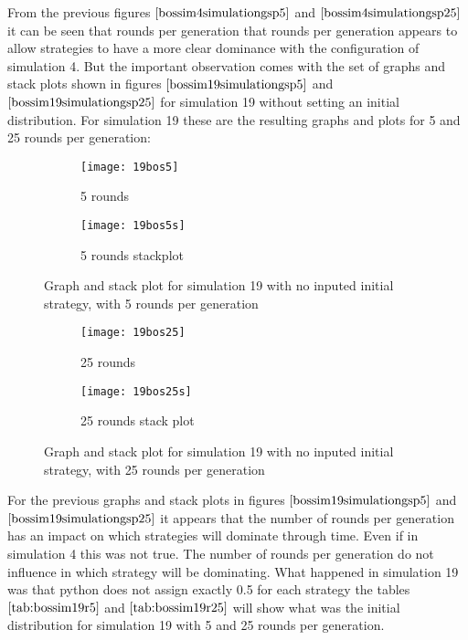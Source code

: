 From the previous figures $\ref{bossim4simulationgsp5}$ and $\ref{bossim4simulationgsp25}$ it can be seen that rounds per generation that rounds per generation appears to allow strategies to have a more clear dominance with the configuration of simulation 4. But the important observation comes with the set of graphs and stack plots shown in figures $\ref{bossim19simulationgsp5}$ and $\ref{bossim19simulationgsp25}$ for simulation 19 without setting an initial distribution.
For simulation 19 these are the resulting graphs and plots for 5 and 25 rounds per generation:
\begin{figure}[H]       
    \centering
    \begin{subfigure}[b]{0.4\textwidth}
	\centering
	{\texttt{[image: 19bos5]}}   
    	\caption{5 rounds}
	\label{fig:bossim19r5}
    \end{subfigure}
    \hfill
    \begin{subfigure}[b]{0.4\textwidth}
	\centering
	{\texttt{[image: 19bos5s]}}   
    	\caption{5 rounds stackplot}
	\label{fig:bossim19rs5}
    \end{subfigure}
    \caption{Graph and stack plot for simulation 19 with no inputed initial strategy, with 5 rounds per generation}
    \label{bossim19simulationgsp5}
\end{figure}

\begin{figure}[H]       
    \centering
    \begin{subfigure}[b]{0.4\textwidth}
	\centering
	{\texttt{[image: 19bos25]}}   
    	\caption{25 rounds}
	\label{fig:bossim19r25}
    \end{subfigure}
    \hfill
    \begin{subfigure}[b]{0.4\textwidth}
	\centering
	{\texttt{[image: 19bos25s]}}   
    	\caption{25 rounds stack plot}
	\label{fig:bossim19rs25}
    \end{subfigure}
    \caption{Graph and stack plot for simulation 19 with no inputed initial strategy, with 25 rounds per generation}
    \label{bossim19simulationgsp25}
\end{figure}
For the previous graphs and stack plots in figures $\ref{bossim19simulationgsp5}$ and $\ref{bossim19simulationgsp25}$  it appears that the number of rounds per generation has an impact on which strategies will dominate through time. Even if  in simulation 4 this was not true. The number of rounds per generation do not influence in which strategy will be dominating. What happened in simulation 19 was that python does not assign exactly 0.5 for each strategy the tables $\ref{tab:bossim19r5}$ and $\ref{tab:bossim19r25}$  will show what was the initial distribution for simulation 19 with 5 and 25 rounds per generation.

